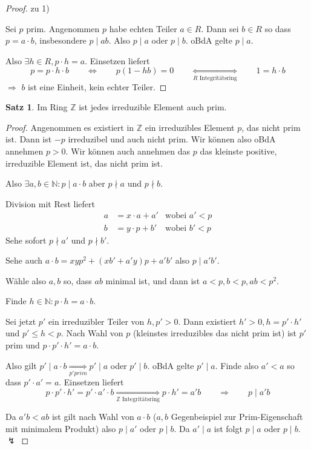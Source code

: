 \documentclass[12pt,parskip=full]{scrartcl}
\newcommand{\setN}{\mathbb{N}}
\newcommand{\setZ}{\mathbb{Z}}
\theoremstyle{definition}
\newtheorem{theorem}{Satz}[section]
\theoremstyle{remark}
\begin{document}
	\begin{proof}
		zu 1)
		
		Sei $p$ prim. Angenommen $p$ habe echten Teiler $a \in R$. Dann sei $b \in R$ so dass $p = a \cdot b$, insbesondere $p \mid ab$. Also $p \mid a$ oder $p \mid b$. oBdA gelte $p \mid a$.
		
		Also $\exists h \in R, p \cdot h = a$. Einsetzen liefert
		\begin{equation*}
			p = p \cdot h \cdot b \qquad \Longleftrightarrow \qquad p(1-hb) = 0 \qquad \underset{\text{$R$ Integritätsring}}{\Longleftrightarrow} \qquad 1 = h \cdot b
		\end{equation*}
		$\Rightarrow$ $b$ ist eine Einheit, kein echter Teiler.
	\end{proof}

	\begin{theorem}
		Im Ring $\setZ$ ist jedes irreduzible Element auch prim.
	\end{theorem}

	\begin{proof}
		Angenommen es existiert in $\setZ$ ein irreduzibles Element $p$, das nicht prim ist. Dann ist $-p$ irreduzibel und auch nicht prim. Wir können also oBdA annehmen $p > 0$. Wir können auch annehmen das $p$ das kleinste positive, irreduzible Element ist, das nicht prim ist.
		
		Also $\exists a,b \in \setN: p \mid a \cdot b$ aber $p \nmid a$ und $p \nmid b$.
		
		Division mit Rest liefert
		\begin{align*}
		 	a &= x \cdot a + a' & \text{wobei $a' < p$}\\
		 	b &= y \cdot p + b' & \text{wobei $b' < p$}
		\end{align*}
		Sehe sofort $p \nmid a'$ und $p \nmid b'$.
		
		Sehe auch $a \cdot b = x y p^2 + (x b' + a' y) p + a'b'$ also $p \mid a' b'$.
		
		Wähle also $a,b$ so, dass $ab$ minimal ist, und dann ist $a < p, b < p, ab < p^2$.
		
		Finde $h \in \setN: p \cdot h = a \cdot b$.
		
		Sei jetzt $p'$ ein irreduzibler Teiler von $h, p' > 0$. Dann existiert $h' > 0, h = p' \cdot h'$ und $p' \leq h < p$. Nach Wahl von $p$ (kleinstes irreduzibles das nicht prim ist) ist $p'$ prim und $p \cdot p' \cdot h' = a \cdot b$.
		
		Also gilt $p' \mid a \cdot b \underset{\text{$p' prim$}}{\Rightarrow} p' \mid a$ oder $p' \mid b$. oBdA gelte $p' \mid a$. Finde also $a' < a$ so dass $p' \cdot a' = a$. Einsetzen liefert 
		\begin{equation*}
			p \cdot p' \cdot h' = p' \cdot a' \cdot b \underset{\text{$\setZ$ Integritätsring}}{\Longrightarrow} p \cdot h' = a' b \qquad\Longrightarrow\qquad p \mid a' b
		\end{equation*}
		
		Da $a' b < ab$ ist gilt nach Wahl von $a \cdot b$ ($a,b$ Gegenbeispiel zur Prim-Eigenschaft mit minimalem Produkt) also $p \mid a'$ oder $p \mid b$. Da $a' \mid a$ ist folgt $p \mid a$ oder $p \mid b$. $\lightning$
	\end{proof}
\end{document}
